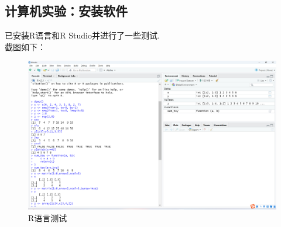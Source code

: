 \documentclass{article}
\begin{document}
\begin{CJK}{UTF8}{gbsn}
\section{计算机实验：安装软件}
已安装R语言和R Studio并进行了一些测试.\\
截图如下：\\
\begin{figure}[htbp]
    \centering
    \includegraphics[scale=0.35]{R_test.png}
    \caption{R语言测试}
    \label{1}
    \end{figure}
\end{CJK}
\end{document}
